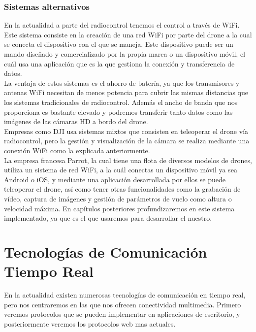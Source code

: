 \subsubsection{Sistemas alternativos}

En la actualidad a parte del radiocontrol tenemos el control a través de WiFi. Este sistema consiste en la creación de una red WiFi por parte del drone a la cual se conecta el dispositivo con el que se maneja. Este dispositivo puede ser un mando diseñado y comercializado por la propia marca o un dispositivo móvil, el cuál usa una aplicación que es la que gestiona la conexión y transferencia de datos.\\

La ventaja de estos sistemas es el ahorro de batería, ya que los transmisores y antenas WiFi necesitan de menos potencia para cubrir las mismas distancias que los sistemas tradicionales de radiocontrol. Además el ancho de banda que nos proporciona es bastante elevado y podremos transferir tanto datos como las imágenes de las cámaras HD a bordo del drone.\\

Empresas como DJI usa sistemas mixtos que consisten en teleoperar el drone vía radiocontrol, pero la gestión y visualización de la cámara se realiza mediante una conexión WiFi como la explicada anteriormente.\\
 
La empresa francesa Parrot, la cual tiene una flota de diversos modelos de drones, utiliza un sistema de red WiFi, a la cuál conectas un dispositivo móvil ya sea Android o iOS, y mediante una aplicación desarrollada por ellos se puede teleoperar el drone, así como tener otras funcionalidades como la grabación de vídeo, captura de imágenes y gestión de parámetros de vuelo como altura o velocidad máxima. En capítulos posteriores profundizaremos en este sistema implementado, ya que es el que usaremos para desarrollar el nuestro.\\



\section{Tecnologías de Comunicación Tiempo Real}

En la actualidad  existen numerosas tecnologías de comunicación en tiempo real, pero nos centraremos en las que nos ofrecen conectividad multimedia. Primero veremos protocolos que se pueden implementar en aplicaciones de escritorio, y posteriormente veremos los protocolos web mas actuales.\\

